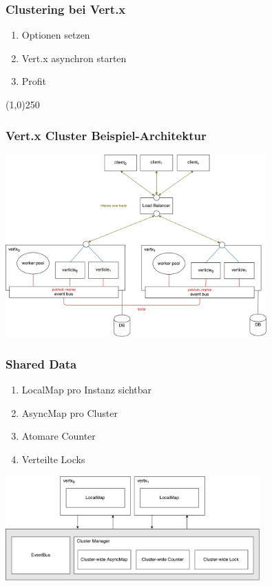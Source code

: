 \documentclass{beamer}
\begin{document}
\begin{frame}
  \frametitle{Clustering bei Vert.x}
  \vspace{1cm}

  \begin{enumerate}
    \item Optionen setzen
    \item Vert.x asynchron starten
    \item Profit
  \end{enumerate}

  \line(1,0){250}

  
\end{frame}



\begin{frame}
  \frametitle{Vert.x Cluster Beispiel-Architektur}
  \vspace{1cm}

  \begin{center}
    \includegraphics[height=7cm]{src/cluster_deployment.pdf}
  \end{center}
\end{frame}

\begin{frame}
  \frametitle{Shared Data}
  \vspace{1cm}

  \begin{enumerate}
    \item LocalMap pro Instanz sichtbar
    \item AsyncMap pro Cluster
    \item Atomare Counter
    \item Verteilte Locks
  \end{enumerate}
  \vspace{.1cm}

  \begin{center}
    \includegraphics[height=4cm]{src/shared_data.pdf}
  \end{center}

\end{frame}
\end{document}
